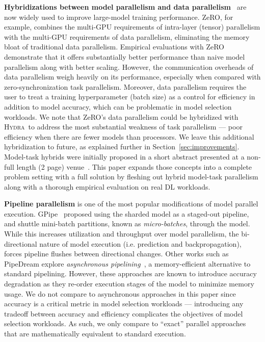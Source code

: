 \documentclass{article}
\newcommand{\system}{\textsc{Hydra}}
\begin{document}
{{\textbf{Hybridizations between model parallelism and data parallelism}~\cite{zeroDeep,zeroOpt,zeroInfinity} are now widely used to improve large-model training performance. ZeRO, for example, combines the multi-GPU requirements of intra-layer (tensor) parallelism with the multi-GPU requirements of data parallelism, eliminating the memory bloat of traditional data parallelism. Empirical evaluations with ZeRO demonstrate that it offers substantially better performance than naive model parallelism along with better scaling. However, the communication overheads of data parallelism weigh heavily on its performance, especially when compared with zero-synchronization task parallelism. Moreover, data parallelism requires the user to treat a training hyperparameter (batch size) as a control for efficiency in addition to model accuracy, which can be problematic in model selection workloads. We note that ZeRO's data parallelism could be hybridized with \system~to address the most substantial weakness of task parallelism --- poor efficiency when there are fewer models than processors. We leave this additional hybridization to future, as explained further in Section~\ref{sec:improvements}. Model-task hybrids were initially proposed in a short abstract presented at a non-full length (2 page) venue~\cite{hydra_cerebro}. 
This paper expands those concepts into a complete problem setting with a full solution by fleshing out hybrid model-task parallelism along with a thorough empirical evaluation on real DL workloads.

\textbf{Pipeline parallelism} is one of the most popular modifications of model parallel execution. GPipe~\cite{gpipe} proposed using the sharded model as a staged-out pipeline, and shuttle mini-batch partitions, known as \textit{micro-batches}, through the model. While this increases utilization and throughput over model parallelism, the bi-directional nature of model execution (i.e. prediction and backpropagation), forces pipeline flushes between directional changes. Other works such as PipeDream explore \textit{asynchronous pipelining}~\cite{harlapPipeline,narayanan2021memoryefficient,yang2020pipemare,gaunt2017ampnet,li2021chimera,shoeybi2019megatron,narayanan2021efficient}, a memory-efficient alternative to standard pipelining. However, these approaches are known to introduce accuracy degradation as they re-order execution stages of the model to minimize memory usage. We do not compare to asynchronous approaches in this paper since accuracy is a critical metric in model selection workloads --- introducing any tradeoff between accuracy and efficiency complicates the objectives of model selection workloads. As such, we only compare to ``exact'' parallel approaches that are mathematically equivalent to standard execution. 

}}
\end{document}
